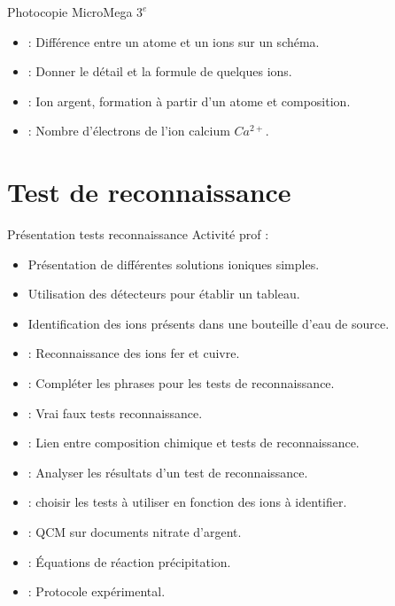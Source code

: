 \documentclass[12pt,a4paper]{article}
\begin{document}
\begin{myexos}Photocopie MicroMega $3^e$
	\begin{itemize}		 
		\item {} : Différence entre un atome et un ions sur un schéma.
		\item {} : Donner le détail et la formule de quelques ions.
		\item {} : Ion argent, formation à partir d'un atome et composition.
		\item {} : Nombre d'électrons de l'ion calcium $Ca^{2+}$.
	\end{itemize}
\end{myexos}

\section{Test de reconnaissance}

\begin{myact}{Présentation tests reconnaissance}
	Activité prof :
	\begin{itemize}
		\item Présentation de différentes solutions ioniques simples.
		\item Utilisation des détecteurs pour établir un tableau.
		\item Identification des ions présents dans une bouteille d'eau de source.
	\end{itemize}
\end{myact}



\begin{myexos}
	\begin{itemize}
		\item {} : Reconnaissance des ions fer et cuivre.
		\item {} : Compléter les phrases pour les tests de reconnaissance.
		\item {} : Vrai faux tests reconnaissance.
		\item {} : Lien entre composition chimique et tests de reconnaissance.
		\item {} : Analyser les résultats d'un test de reconnaissance.
		\item {} : choisir les tests à utiliser en fonction des ions à identifier.
		\item {} : QCM sur documents nitrate d'argent.
		\item {} : \'Equations de réaction précipitation.
		\item {} : Protocole expérimental.
		
	
	\end{itemize}
\end{myexos}
\end{document}
